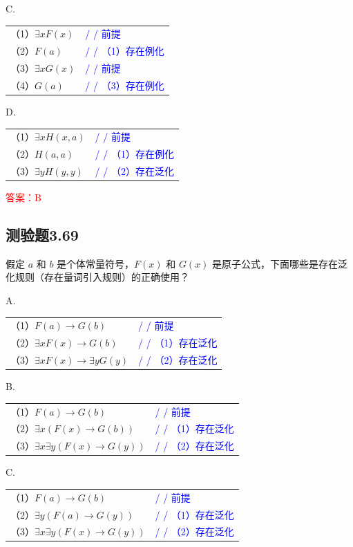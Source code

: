 \documentclass[UTF8, heading=true]{ctexart}
\begin{document}
C. 

\begin{tabular}{ll}
  （1）$\exists x F(x)$ & \textcolor{blue}{/ / 前提} \\
  （2）$F(a)$ & \textcolor{blue}{/ / （1）存在例化} \\
  （3）$\exists x G(x)$ & \textcolor{blue}{/ / 前提} \\
  （4）$G(a)$ & \textcolor{blue}{/ / （3）存在例化}
\end{tabular}

D. 

\begin{tabular}{ll}
  （1）$\exists x H(x, a)$ & \textcolor{blue}{/ / 前提} \\
  （2）$H(a, a)$ & \textcolor{blue}{/ / （1）存在例化} \\
  （3）$\exists y H(y, y)$ & \textcolor{blue}{/ / （2）存在泛化}
\end{tabular}

\textcolor{red}{答案：B}

\subsection{测验题3.69}

假定 $a$ 和 $b$ 是个体常量符号，$F(x)$ 和 $G(x)$ 是原子公式，下面哪些是存在泛化规则（存在量词引入规则）的正确使用？


A. 

\begin{tabular}{ll}
  （1）$F(a) \rightarrow G(b)$ & \textcolor{blue}{/ / 前提} \\
  （2）$\exists x F(x) \rightarrow G(b)$ & \textcolor{blue}{/ / （1）存在泛化} \\
  （3）$\exists x F(x) \rightarrow \exists y G(y)$ & \textcolor{blue}{/ / （2）存在泛化}
\end{tabular}

B. 

\begin{tabular}{ll}
  （1）$F(a) \rightarrow G(b)$ & \textcolor{blue}{/ / 前提} \\
  （2）$\exists x(F(x) \rightarrow G(b))$ & \textcolor{blue}{/ / （1）存在泛化} \\
  （3）$\exists x \exists y(F(x) \rightarrow G(y))$ & \textcolor{blue}{/ / （2）存在泛化}
\end{tabular}

C. 

\begin{tabular}{ll}
  （1）$F(a) \rightarrow G(b)$ & \textcolor{blue}{/ / 前提} \\
  （2）$\exists y(F(a) \rightarrow G(y))$ & \textcolor{blue}{/ / （1）存在泛化} \\
  （3）$\exists x \exists y(F(x) \rightarrow G(y))$ & \textcolor{blue}{/ / （2）存在泛化}
\end{tabular}
\end{document}
